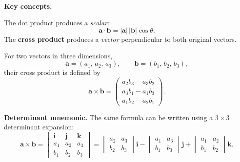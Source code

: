 %
\begingroup
\small

\noindent{}

\vspace{0.8em}

\noindent\textbf{Key concepts.}

The dot product produces a \emph{scalar}:
\[
  \mathbf{a} \cdot \mathbf{b}
  = |\mathbf{a}|\,|\mathbf{b}|\cos\theta.
\]
The \textbf{cross product} produces a \emph{vector} perpendicular to
both original vectors.

For two vectors in three dimensions,
\[
  \mathbf{a} = (a_1,\, a_2,\, a_3),
  \qquad
  \mathbf{b} = (b_1,\, b_2,\, b_3),
\]
their cross product is defined by
\[
  \boxed{
  \mathbf{a} \times \mathbf{b}
  = \begin{pmatrix}
      a_2 b_3 - a_3 b_2 \\
      a_3 b_1 - a_1 b_3 \\
      a_1 b_2 - a_2 b_1
    \end{pmatrix}}.
\]

\vspace{0.4em}
\noindent\textbf{Determinant mnemonic.}
The same formula can be written using a $3\times 3$ determinant
expansion:
\[
  \mathbf{a} \times \mathbf{b}
  = \begin{vmatrix}
      \mathbf{i} & \mathbf{j} & \mathbf{k} \\
      a_1 & a_2 & a_3 \\
      b_1 & b_2 & b_3
    \end{vmatrix}
  = \begin{vmatrix} a_2 & a_3 \\ b_2 & b_3 \end{vmatrix}\mathbf{i}
  - \begin{vmatrix} a_1 & a_3 \\ b_1 & b_3 \end{vmatrix}\mathbf{j}
  + \begin{vmatrix} a_1 & a_2 \\ b_1 & b_2 \end{vmatrix}\mathbf{k}.
\]

